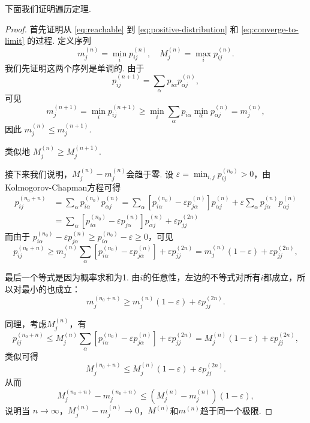 下面我们证明遍历定理.
\begin{proof}
首先证明从 \eqref{eq:reachable} 到 \eqref{eq:positive-distribution} 和 \eqref{eq:converge-to-limit} 的过程. 定义序列
\[
m_j^{(n)} = \min _i p_{i j}^{(n)}, \quad M_j^{(n)} = \max _i p_{i j}^{(n)}.
\]
我们先证明这两个序列是单调的. 由于
\[
p_{i j}^{(n+1)} = \sum_\alpha p_{i \alpha} p_{\alpha j}^{(n)},
\]
可见
\[
m_j^{(n+1)} = \min _i p_{i j}^{(n+1)} \geq \min _i \sum_\alpha p_{i \alpha} \min _\alpha p_{\alpha j}^{(n)} = m_j^{(n)},
\]
因此 $m_j^{(n)} \leq m_j^{(n+1)}$. 

类似地 $M_j^{(n)} \geq M_j^{(n+1)}$. 

接下来我们说明，$M_j^{(n)} - m_j^{(n)}$会趋于零. 设 $\varepsilon = \min _{i, j} p_{i j}^{\left(n_0\right)} > 0$，由Kolmogorov-Chapman方程可得
\begin{align*}
    p_{i j}^{\left(n_0+n\right)} &= \sum_\alpha p_{i \alpha}^{\left(n_0\right)} p_{\alpha j}^{(n)} = \sum_\alpha\left[p_{i \alpha}^{\left(n_0\right)} - \varepsilon p_{j \alpha}^{(n)}\right] p_{\alpha j}^{(n)} + \varepsilon \sum_\alpha p_{j \alpha}^{(n)} p_{\alpha j}^{(n)} \\
    &= \sum_\alpha\left[p_{i \alpha}^{\left(n_0\right)} - \varepsilon p_{j \alpha}^{(n)}\right] p_{\alpha j}^{(n)} + \varepsilon p_{j j}^{(2 n)}
\end{align*}
而由于 $p_{i \alpha}^{\left(n_0\right)} - \varepsilon p_{j \alpha}^{(n)} \geq p_{i \alpha}^{\left(n_0\right)} - \varepsilon \geq 0$，可见
\[
p_{i j}^{\left(n_0+n\right)} \geq m_j^{(n)} \sum_\alpha\left[p_{i \alpha}^{\left(n_0\right)} - \varepsilon p_{j \alpha}^{(n)}\right] + \varepsilon p_{j j}^{(2 n)} = m_j^{(n)} (1-\varepsilon) + \varepsilon p_{j j}^{(2 n)},
\]

最后一个等式是因为概率求和为1. 由$i$的任意性，左边的不等式对所有$i$都成立，所以对最小的也成立：
\[
m_j^{\left(n_0+n\right)} \geq m_j^{(n)} (1-\varepsilon) + \varepsilon p_{j j}^{(2 n)}.
\]

同理，考虑$M_j^{(n)}$，有
\[
p_{i j}^{\left(n_0+n\right)} \leq M_j^{(n)} \sum_\alpha\left[p_{i \alpha}^{\left(n_0\right)} - \varepsilon p_{j \alpha}^{(n)}\right] + \varepsilon p_{j j}^{(2 n)}= M_j^{(n)} (1-\varepsilon) + \varepsilon p_{j j}^{(2 n)},
\]
类似可得
\[
M_j^{\left(n_0+n\right)} \leq M_j^{(n)} (1-\varepsilon) + \varepsilon p_{j j}^{(2 n)}.
\]
从而
\[
M_j^{\left(n_0+n\right)} - m_j^{\left(n_0+n\right)} \leq \left(M_j^{(n)} - m_j^{(n)}\right)(1-\varepsilon),
\]
说明当 $n \rightarrow \infty$，$M_j^{(n)} - m_j^{(n)} \to 0$，$M^{(n)}$和$m^{(n)}$趋于同一个极限. 


\end{proof}
